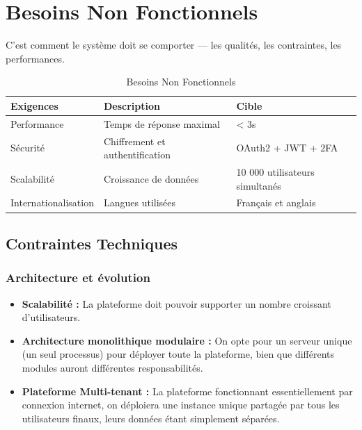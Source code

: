 \documentclass[12pt,a4paper]{report}
\begin{document}
	\section{Besoins Non Fonctionnels} 
	C'est comment le système doit se comporter — les qualités, les contraintes, les performances. 
	\begin{table}[H] 
		\centering 
		\begin{tabular}{lp{7cm}l} 
			\toprule 
			\textbf{Exigences} & \textbf{Description} & \textbf{Cible}\\ 
			\toprule 
			Performance  & Temps de réponse maximal & < 3s \\[4pt] 
			Sécurité & Chiffrement et authentification & OAuth2 + JWT + 2FA \\[4pt] 
			Scalabilité  & Croissance de données & 10 000 utilisateurs simultanés \\[4pt] 
			Internationalisation & Langues utilisées & Français et anglais \\[4pt] 
			\bottomrule 
		\end{tabular} 
        \caption{Besoins Non Fonctionnels}
	\end{table} %
	
\subsection{Contraintes Techniques}

\subsubsection*{Architecture et évolution}
\begin{itemize}
    \item \textbf{Scalabilité :} La plateforme doit pouvoir supporter un nombre croissant d'utilisateurs.
    \item \textbf{Architecture monolithique modulaire :} On opte pour un serveur unique (un seul processus) pour déployer toute la plateforme, bien que différents modules auront différentes responsabilités.
    \item \textbf{Plateforme Multi-tenant :} La plateforme fonctionnant essentiellement par connexion internet, on déploiera une instance unique partagée par tous les utilisateurs finaux, leurs données étant simplement séparées.
\end{itemize}
\end{document}
